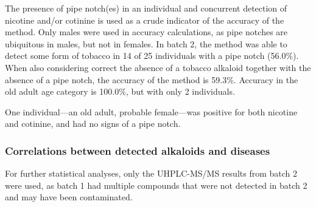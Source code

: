 \documentclass[
]{article}
\begin{document}
The presence of pipe notch(es) in an individual and concurrent detection
of nicotine and/or cotinine is used as a crude indicator of the accuracy
of the method. Only males were used in accuracy calculations, as pipe
notches are ubiquitous in males, but not in females. In batch 2, the
method was able to detect some form of tobacco in 14 of 25 individuals
with a pipe notch (56.0\%). When also considering correct the absence of
a tobacco alkaloid together with the absence of a pipe notch, the
accuracy of the method is 59.3\%. Accuracy in the old adult age category
is 100.0\%, but with only 2 individuals.

One individual---an old adult, probable female---was positive for both
nicotine and cotinine, and had no signs of a pipe notch.

\hypertarget{correlations-between-detected-alkaloids-and-diseases}{%
\subsubsection{Correlations between detected alkaloids and
diseases}\label{correlations-between-detected-alkaloids-and-diseases}}

For further statistical analyses, only the UHPLC-MS/MS results from
batch 2 were used, as batch 1 had multiple compounds that were not
detected in batch 2 and may have been contaminated.
\end{document}
